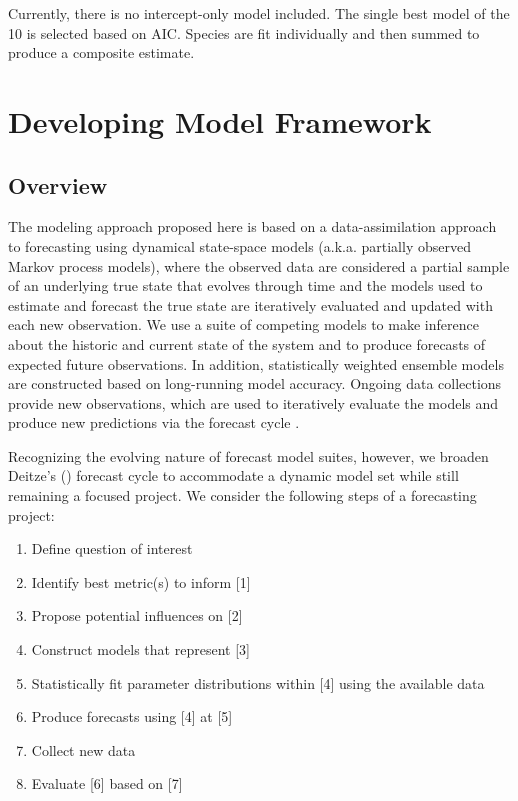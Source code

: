 \documentclass{article}
\begin{document}
Currently, there is no intercept-only model included. The single best model of the 10 is selected based on AIC. Species are fit individually and then summed to produce a composite estimate. 

\section{Developing Model Framework}
\label{sec:devmods}

\subsection{Overview}
\label{subsec:devmods_ov}

The modeling approach proposed here is based on a data-assimilation approach to forecasting using dynamical state-space models (a.k.a. partially observed Markov process models), where the observed data are considered a partial sample of an underlying true state that evolves through time \citep{Ionides2006, King2016} and the models used to estimate and forecast the true state are iteratively evaluated and updated with each new observation. We use a suite of competing models to make inference about the historic and current state of the system and to produce forecasts of expected future observations. In addition, statistically weighted ensemble models are constructed based on long-running model accuracy. Ongoing data collections provide new observations, which are used to iteratively evaluate the models and produce new predictions via the forecast cycle \citep{Dietze2017}. 

Recognizing the evolving nature of forecast model suites, however, we broaden Deitze's (\citeyear{Dietze2017}) forecast cycle to accommodate a dynamic model set while still remaining a focused project. We consider the following steps of a forecasting project:

\begin{enumerate}
\item{Define question of interest} 
\item{Identify best metric(s) to inform [1]}
\item{Propose potential influences on [2]} 
\item{Construct models that represent [3]}
\item{Statistically fit parameter distributions within [4] using the available data}
\item{Produce forecasts using [4] at [5]} 
\item{Collect new data}
\item{Evaluate [6] based on [7]}
\end{enumerate}
\end{document}
